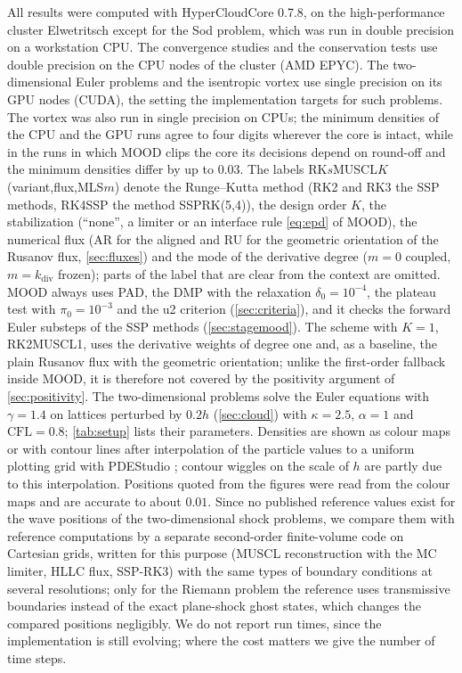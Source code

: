 \documentclass[11pt,a4paper]{article}
\numberwithin{equation}{section}
\newcommand{\CFL}{\mathrm{CFL}}
\begin{document}
All results were computed with HyperCloudCore 0.7.8, on the high-performance cluster Elwetritsch except for the Sod problem, which was run in double precision on a workstation CPU. The convergence studies and the conservation tests use double precision on the CPU nodes of the cluster (AMD EPYC). The two-dimensional Euler problems and the isentropic vortex use single precision on its GPU nodes (CUDA), the setting the implementation targets for such problems. The vortex was also run in single precision on CPUs; the minimum densities of the CPU and the GPU runs agree to four digits wherever the core is intact, while in the runs in which MOOD clips the core its decisions depend on round-off and the minimum densities differ by up to $0.03$. The labels RK$s$MUSCL$K$(variant,flux,MLS$m$) denote the Runge--Kutta method (RK2 and RK3 the SSP methods, RK4SSP the method SSPRK(5,4)), the design order $K$, the stabilization (``none'', a limiter or an interface rule \eqref{eq:epd} of MOOD), the numerical flux (AR for the aligned and RU for the geometric orientation of the Rusanov flux, \cref{sec:fluxes}) and the mode of the derivative degree ($m=0$ coupled, $m=k_{\mathrm{div}}$ frozen); parts of the label that are clear from the context are omitted. MOOD always uses PAD, the DMP with the relaxation $\delta_0=10^{-4}$, the plateau test with $\pi_0=10^{-3}$ and the u2 criterion (\cref{sec:criteria}), and it checks the forward Euler substeps of the SSP methods (\cref{sec:stagemood}). The scheme with $K=1$, RK2MUSCL1, uses the derivative weights of degree one and, as a baseline, the plain Rusanov flux with the geometric orientation; unlike the first-order fallback inside MOOD, it is therefore not covered by the positivity argument of \cref{sec:positivity}. The two-dimensional problems solve the Euler equations with $\gamma=1.4$ on lattices perturbed by $0.2h$ (\cref{sec:cloud}) with $\kappa=2.5$, $\alpha=1$ and $\CFL=0.8$; \cref{tab:setup} lists their parameters. Densities are shown as colour maps or with contour lines after interpolation of the particle values to a uniform plotting grid with PDEStudio \cite{jung_pdestudio}; contour wiggles on the scale of $h$ are partly due to this interpolation. Positions quoted from the figures were read from the colour maps and are accurate to about $0.01$. Since no published reference values exist for the wave positions of the two-dimensional shock problems, we compare them with reference computations by a separate second-order finite-volume code on Cartesian grids, written for this purpose (MUSCL reconstruction with the MC limiter, HLLC flux, SSP-RK3) with the same types of boundary conditions at several resolutions; only for the Riemann problem the reference uses transmissive boundaries instead of the exact plane-shock ghost states, which changes the compared positions negligibly. We do not report run times, since the implementation is still evolving; where the cost matters we give the number of time steps.
\end{document}
